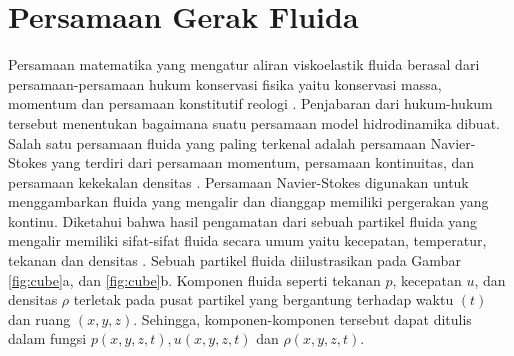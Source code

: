 \section[Persamaan Gerak Fluida]{Persamaan Gerak Fluida}
\begin{spacing}{1.5}
	
	Persamaan matematika yang mengatur aliran viskoelastik fluida berasal dari persamaan-persamaan hukum konservasi fisika yaitu konservasi massa, momentum dan persamaan konstitutif reologi . Penjabaran dari hukum-hukum tersebut menentukan bagaimana suatu persamaan model hidrodinamika dibuat. Salah satu persamaan fluida yang paling terkenal adalah persamaan Navier-Stokes yang terdiri dari persamaan momentum, persamaan kontinuitas, dan persamaan kekekalan densitas . Persamaan Navier-Stokes digunakan untuk menggambarkan fluida yang mengalir dan dianggap memiliki pergerakan yang kontinu. Diketahui bahwa hasil pengamatan dari sebuah partikel fluida yang mengalir memiliki sifat-sifat fluida secara umum yaitu kecepatan, temperatur, tekanan dan densitas . Sebuah partikel fluida diilustrasikan pada Gambar \ref{fig:cube}a, dan \ref{fig:cube}b. Komponen fluida seperti tekanan $p$, kecepatan $u$, dan densitas $\rho$ terletak pada pusat partikel yang bergantung terhadap waktu $(t)$ dan ruang $(x,y,z)$. Sehingga, komponen-komponen tersebut dapat ditulis dalam fungsi $p(x,y,z,t), u(x,y,z,t)$  dan $\rho(x,y,z,t)$. 
	

\end{spacing}
